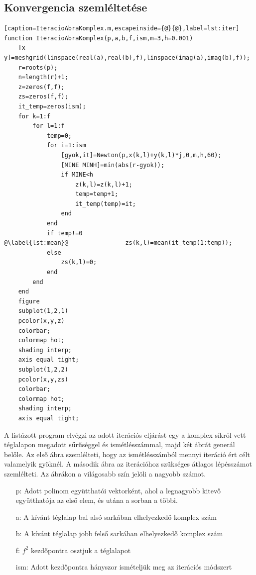 \documentclass[a4paper,12pt]{report}
\begin{document}
\begin{appendices}
		\section{Konvergencia szemléltetése} \label{Konvergencia}
			\begin{singlespace}
            \begin{lstlisting}[caption=IteracioAbraKomplex.m,escapeinside={@}{@},label=lst:iter]
function IteracioAbraKomplex(p,a,b,f,ism,m=3,h=0.001)
    [x y]=meshgrid(linspace(real(a),real(b),f),linspace(imag(a),imag(b),f));
    r=roots(p);
    n=length(r)+1;
    z=zeros(f,f);
    zs=zeros(f,f);
    it_temp=zeros(ism);
    for k=1:f
        for l=1:f
            temp=0;
            for i=1:ism
                [gyok,it]=Newton(p,x(k,l)+y(k,l)*j,0,m,h,60);
                [MINE MINH]=min(abs(r-gyok));
                if MINE<h
                    z(k,l)=z(k,l)+1;
                    temp=temp+1;
                    it_temp(temp)=it;
                end
            end
            if temp!=0
@\label{lst:mean}@                zs(k,l)=mean(it_temp(1:temp));
            else
                zs(k,l)=0;
            end
        end
    end
    figure
    subplot(1,2,1)
    pcolor(x,y,z)
    colorbar;
    colormap hot;
    shading interp;
    axis equal tight;
    subplot(1,2,2)
    pcolor(x,y,zs)
    colorbar;
    colormap hot;
    shading interp;
    axis equal tight;
			\end{lstlisting}
            \end{singlespace}
			A listázott program elvégzi az adott iterációs eljárást egy a komplex síkról vett téglalapon megadott sűrűséggel és ismétlésszámmal, majd két ábrát generál belőle. Az első ábra szemlélteti, hogy az ismétlésszámból mennyi iteráció ért célt valamelyik gyöknél. A második ábra az iterációhoz szükséges átlagos lépésszámot szemlélteti. Az ábrákon a világosabb szín jelöli a nagyobb számot.
			\begin{enumerate}
				\item[p:] Adott polinom együtthatói vektorként, ahol a legnagyobb kitevő együtthatója az első elem, és utána a sorban a többi.
				\item[a:] A kívánt téglalap bal alsó sarkában elhelyezkedő komplex szám
				\item[b:] A kívánt téglalap jobb felső sarkában elhelyezkedő komplex szám
				\item[f:] $f^2$ kezdőpontra osztjuk a téglalapot
				\item[ism:] Adott kezdőpontra hányszor ismételjük meg az iterációs módszert

\end{enumerate}
\end{appendices}
\end{document}
